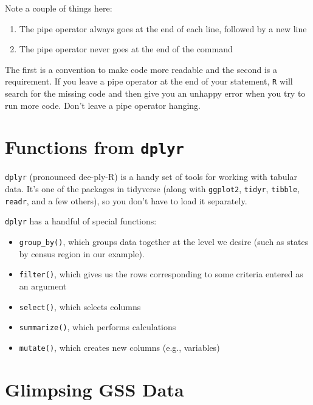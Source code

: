 \documentclass[
]{book}
\begin{document}
Note a couple of things here:

\begin{enumerate}
\def\labelenumi{\arabic{enumi}.}
\item
  The pipe operator always goes at the end of each line, followed by a new line
\item
  The pipe operator never goes at the end of the command
\end{enumerate}

The first is a convention to make code more readable and the second is a requirement. If you leave a pipe operator at the end of your statement, \texttt{R} will search for the missing code and then give you an unhappy error when you try to run more code. Don't leave a pipe operator hanging.

\hypertarget{functions-from-dplyr}{%
\section{\texorpdfstring{Functions from \texttt{dplyr}}{Functions from dplyr}}\label{functions-from-dplyr}}

\texttt{dplyr} (pronounced dee-ply-R) is a handy set of tools for working with tabular data. It's one of the packages in tidyverse (along with \texttt{ggplot2}, \texttt{tidyr}, \texttt{tibble}, \texttt{readr}, and a few others), so you don't have to load it separately.

\texttt{dplyr} has a handful of special functions:

\begin{itemize}
\item
  \texttt{group\_by()}, which groups data together at the level we desire (such as states by census region in our example).
\item
  \texttt{filter()}, which gives us the rows corresponding to some criteria entered as an argument
\item
  \texttt{select()}, which selects columns
\item
  \texttt{summarize()}, which performs calculations
\item
  \texttt{mutate()}, which creates new columns (e.g., variables)
\end{itemize}

\hypertarget{glimpsing-gss-data}{%
\section{Glimpsing GSS Data}\label{glimpsing-gss-data}}
\end{document}
